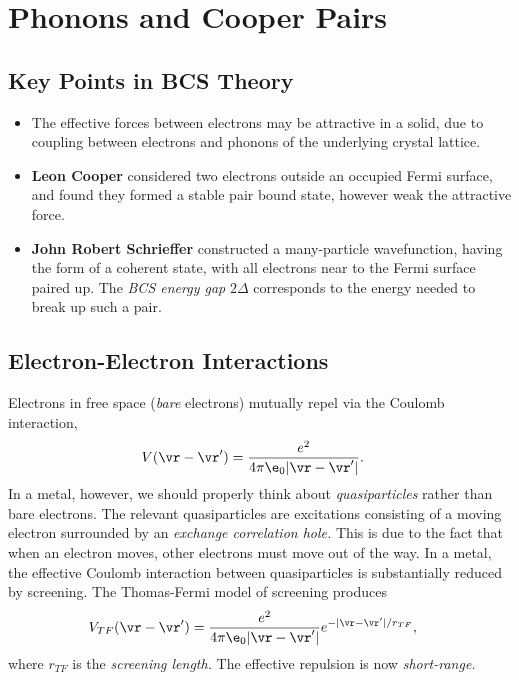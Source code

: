 \documentclass[a4paper, 11pt, normalem]{report}
\begin{document}
\chapter{Phonons and Cooper Pairs}
\section{Key Points in BCS Theory}
\begin{itemize}
    \item The effective forces between electrons may be attractive in a solid, due to coupling between electrons and phonons of the underlying crystal lattice.
    \item \textbf{Leon Cooper} considered two electrons outside an occupied Fermi surface, and found they formed a stable pair bound state, however weak the attractive force.
    \item \textbf{John Robert Schrieffer} constructed a many-particle wavefunction, having the form of a coherent state, with all electrons near to the Fermi surface paired up.
        The \emph{BCS energy gap} $2\Delta$ corresponds to the energy needed to break up such a pair.
\end{itemize}

\section{Electron-Electron Interactions}
Electrons in free space (\emph{bare} electrons) mutually repel via the Coulomb interaction,
\begin{align}
    V(\vr-\vr') &= \frac{e^2}{4\pi\e_0|\vr-\vr'|}.
\end{align}
In a metal, however, we should properly think about \emph{quasiparticles} rather than bare electrons.
The relevant quasiparticles are excitations consisting of a moving electron surrounded by an \emph{exchange correlation hole.}
This is due to the fact that when an electron moves, other electrons must move out of the way.
In a metal, the effective Coulomb interaction between quasiparticles is substantially reduced by screening.
The Thomas-Fermi model of screening produces
\begin{align}
    V_{TF}(\vr-\vr') &= \frac{e^2}{4\pi\e_0|\vr-\vr'|}e^{-|\vr-\vr'|/r_{TF}},
\end{align}
where $r_{TF}$ is the \emph{screening length.}
The effective repulsion is now \emph{short-range.}
\end{document}
